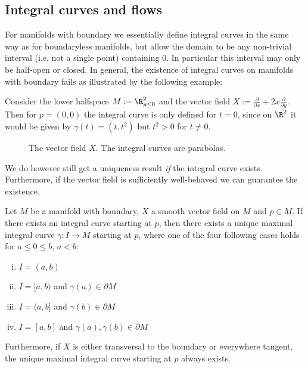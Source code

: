 
\subsection{Integral curves and flows}

For manifolds with boundary we essentially define integral curves in the same way as for boundaryless manifolds, but allow the domain to be any non-trivial interval (i.e. not a single point) containing $0$. In particular this interval may only be half-open or closed. In general, the existence of integral curves on manifolds with boundary fails as illustrated by the following example:

\begin{counterexample}
    \label{rem:vector_field_example}
    Consider  the lower halfspace $M := \R^2_{y \leq 0}$ and the vector field $X := \frac{\partial}{\partial x} + 2x \frac{\partial}{\partial y}$. Then for $p = (0,0)$ the integral curve is only defined for $t = 0$, since on $\R^2$ it would be given by $\gamma(t) = (t,t^2)$ but $t^2 > 0$ for $t \neq 0$.
    \begin{figure}[ht]
        \centering
        \label{fig:vector_field1}
        
        \caption{The vector field $X$. The integral curves are parabolas.}
    \end{figure}
\end{counterexample}

We do however still get a uniqueness result \textit{if} the integral curve exists. Furthermore, if the vector field is sufficiently well-behaved we can guarantee the existence.

\begin{lemma}
    \label{lem:existence_integral_curves}
    Let $M$ be a manifold with boundary, $X$ a smooth vector field on $M$ and $p \in M$. If there exists an integral curve starting at $p$, then there exists a unique maximal integral curve $\gamma \colon I \to M$ starting at $p$, where one of the four following cases holds for $a \leq 0 \leq b$, $a<b$:
    \begin{enumerate}[(i)]
        \item $I = (a,b)$
        \item $I = [a,b)$ and $\gamma(a) \in \partial M$
        \item $I = (a,b]$ and $\gamma(b) \in \partial M$
        \item $I = [a,b]$ and $\gamma(a),\gamma(b) \in \partial M$
    \end{enumerate}
    Furthermore, if $X$ is either transversal to the boundary or everywhere tangent, the unique maximal integral curve starting at $p$ always exists.
\end{lemma}

